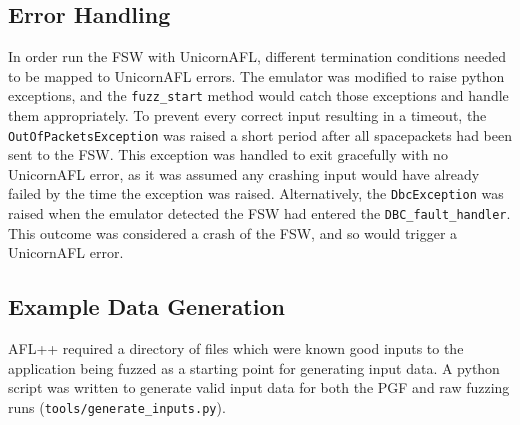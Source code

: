 \documentclass[../report.tex]{subfiles}
\begin{document}
\subsection{Error Handling} \label{sec:fuzz-err}

In order run the FSW with UnicornAFL, different termination conditions needed
to be mapped to UnicornAFL errors. The emulator was modified to raise python
exceptions, and the \lstinline|fuzz_start| method would catch those exceptions
and handle them appropriately. To prevent every correct input resulting in a
timeout, the \lstinline|OutOfPacketsException| was raised a short period after
all spacepackets had been sent to the FSW. This exception was handled to exit
gracefully with no UnicornAFL error, as it was assumed any crashing input would
have already failed by the time the exception was raised. Alternatively, the
\lstinline|DbcException| was raised when the emulator detected the FSW had
entered the \lstinline|DBC_fault_handler|. This outcome was considered a crash
of the FSW, and so would trigger a UnicornAFL error.

\subsection{Example Data Generation}

AFL++ required a directory of files which were known
good inputs to the application being fuzzed as a starting point for generating
input data. A python script was written to generate valid input data for both
the PGF and raw fuzzing runs
(\lstinline|tools/generate_inputs.py|).
\end{document}
